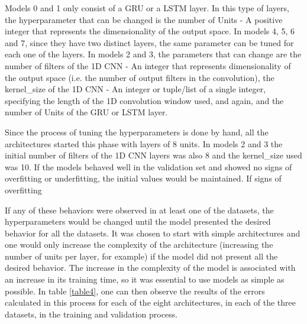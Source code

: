 Models 0 and 1 only consist of a \ac{GRU} or a \ac{LSTM} layer. In this type of layers, the hyperparameter that can be changed is the number of Units - A positive integer that represents the dimensionality of the output space. In models 4, 5, 6 and 7, since they have two distinct layers, the same parameter can be tuned for each one of the layers. In models 2 and 3, the parameters that can change are the number of filters of the \ac{1D CNN} - An integer that represents dimensionality of the output space (i.e. the number of output filters in the convolution), the kernel\_size of the \ac{1D CNN} - An integer or tuple/list of a single integer, specifying the length of the 1D convolution window used, and again, and the number of Units of the \ac{GRU} or \ac{LSTM} layer. 


Since the process of tuning the hyperparameters is done by hand, all the architectures started this phase with layers of 8 units. In models 2 and 3 the initial number of filters of the \ac{1D CNN} layers was also 8 and the kernel\_size used was 10. If the models behaved well in the validation set and showed no signs of overfitting or underfitting, the initial values would be maintained. If signs of overfitting 



If any of these behaviors were observed in at least one of the datasets, the hyperparameters would be changed until the model presented the desired behavior for all the datasets. It was chosen to start with simple architectures and one would only increase the complexity of the architecture (increasing the number of units per layer, for example) if the model did not present all the desired behavior. The increase in the complexity of the model is associated with an increase in its training time, so it was essential to use models as simple as possible. In table \ref{table4}, one can then observe the results of the errors calculated in this process for each of the eight architectures, in each of the three datasets, in the training and validation process.

